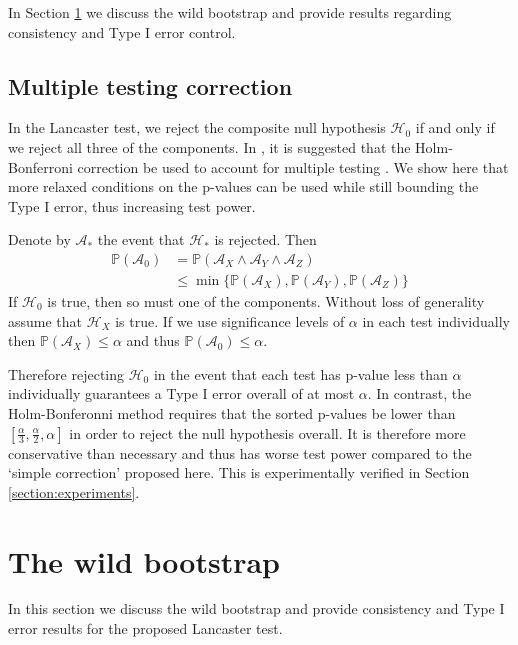 \documentclass[]{article}
\begin{document}
In Section \ref{section:details} we discuss the wild bootstrap and provide results regarding consistency and Type I error control.

\subsection{Multiple testing correction}
In the Lancaster test, we reject the composite null hypothesis $\mathcal{H}_0$ if and only if we reject all three of the components. In \citet{sejdinovic2013kernel}, it is suggested that the Holm-Bonferroni correction be used to account for multiple testing \citep{holm1979simple}. We show here that more relaxed conditions on the p-values can be used while still bounding the Type I error, thus increasing test power.

Denote by $\mathcal{A}_*$ the event that $\mathcal{H}_*$ is rejected. Then
\begin{align*}
\mathbb{P}(\mathcal{A}_0) &= \mathbb{P}(\mathcal{A}_X \land \mathcal{A}_Y \land \mathcal{A}_Z) \\
&\leq \min\{\mathbb{P}(\mathcal{A}_X), \mathbb{P}(\mathcal{A}_Y), \mathbb{P}(\mathcal{A}_Z)\}
\end{align*}
If $\mathcal{H}_0$ is true, then so must one of the components. Without loss of generality assume that $\mathcal{H}_X$ is true. If we use significance levels of $\alpha$ in each test individually then $\mathbb{P}(\mathcal{A}_X) \leq \alpha$ and thus $\mathbb{P}(\mathcal{A}_0) \leq \alpha$.

Therefore rejecting $\mathcal{H}_0$ in the event that each test has p-value less than $\alpha$ individually guarantees a Type I error overall of at most $\alpha$. In contrast, the Holm-Bonferonni method requires that the sorted p-values be lower than $[\frac{\alpha}{3},\frac{\alpha}{2},\alpha]$ in order to reject the null hypothesis overall. It is therefore more conservative than necessary and thus has worse test power compared to the `simple correction' proposed here. This is experimentally verified in Section \ref{section:experiments}.



\section{The wild bootstrap}\label{section:details}

In this section we discuss the wild bootstrap and provide consistency and Type I error results for the proposed Lancaster test.
\end{document}
